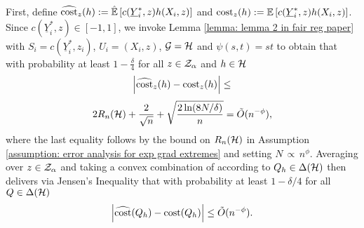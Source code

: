 \documentclass{article}
\begin{document}
First, define $\widehat{\operatorname{cost}}_{z}(h) := \hat{\mathbb{E}}\left[ c(\underline{Y}^*_i, z) h(X_i, z) \right]$ and $\operatorname{cost}_z(h) := \mathbb{E}\left[ c(\underline{Y}^*_i, z) h(X_i, z) \right]$. Since $c(\underline{Y}^*_i, z) \in [-1, 1]$, we invoke Lemma \ref{lemma: lemma 2 in fair reg paper} with $S_i = c(\underline{Y}^*_i, z_i)$, $U_i = (X_i, z)$, $\mathcal{G} = \mathcal{H}$ and $\psi(s, t) = st$ to obtain that with probability at least $1 - \frac{\delta}{4}$ for all $z \in \mathcal{Z}_\alpha$ and $h \in \mathcal{H}$
        \[
        \left| \widehat{\operatorname{cost}}_z(h) - \operatorname{cost}_z(h) \right| \leq 
        \]
        \[
        2 R_n(\mathcal{H}) + \frac{2}{\sqrt{n}} + \sqrt{ \frac{2 \ln(8 N/\delta)}{ n } } = \tilde{O}(n^{-\phi}),
        \]
where the last equality follows by the bound on $R_n(\mathcal{H})$ in Assumption \ref{assumption: error analysis for exp grad extremes} and setting $N \, \propto \, n^\phi$. Averaging over $z \in \mathcal{Z}_\alpha$ and taking a convex combination of according to $Q_h \in \Delta(\mathcal{H})$ then delivers via Jensen's Inequality that with probability at least $1 - \delta/4$ for all $Q \in \Delta(\mathcal{H})$
        \begin{equation}\label{equation: cost bound i, extremes}
            \left| \widehat{\operatorname{cost}}(Q_h) - \operatorname{cost}(Q_h) \right| \leq \tilde{O}(n^{-\phi}).
        \end{equation}
        
\end{document}
